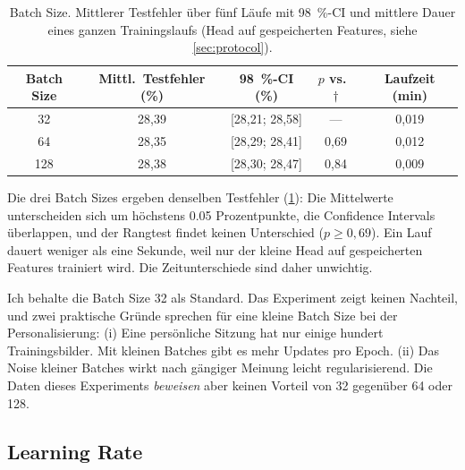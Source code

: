 \begin{table}[htbp]
  \centering
  \caption[Batch Size]{Batch Size. Mittlerer Testfehler über fünf Läufe mit
           \SI{98}{\percent}-CI und mittlere Dauer eines ganzen
           Trainingslaufs (Head auf gespeicherten Features, siehe
           \cref{sec:protocol}).}
  \label{tab:batch_size}
  \small
  \begin{tabular}{ccccc}
    \toprule
    Batch Size & Mittl.\ Testfehler (\%) & \SI{98}{\percent}-CI (\%) & $p$ vs.\ $\dagger$ & Laufzeit (min) \\
    \midrule
    32\sel{}     & 28,39 & [28,21; 28,58] & ---  & 0,019 \\
    64           & 28,35 & [28,29; 28,41] & 0,69 & 0,012 \\
    128          & 28,38 & [28,30; 28,47] & 0,84 & 0,009 \\
    \bottomrule
  \end{tabular}
\end{table}

Die drei Batch Sizes ergeben denselben Testfehler (\cref{tab:batch_size}): Die
Mittelwerte unterscheiden sich um höchstens \num{0,05} Prozentpunkte, die
Confidence Intervals überlappen, und der Rangtest findet keinen Unterschied
($p\ge0,69$). Ein Lauf dauert weniger als eine Sekunde, weil nur der kleine
Head auf gespeicherten Features trainiert wird. Die Zeitunterschiede sind
daher unwichtig.

Ich behalte die Batch Size 32 als Standard. Das Experiment zeigt keinen
Nachteil, und zwei praktische Gründe sprechen für eine kleine Batch Size bei
der Personalisierung: (i) Eine persönliche Sitzung hat nur einige hundert
Trainingsbilder. Mit kleinen Batches gibt es mehr Updates pro Epoch. (ii) Das
Noise kleiner Batches wirkt nach gängiger Meinung leicht regularisierend.
Die Daten dieses Experiments \emph{beweisen} aber keinen Vorteil von 32
gegenüber 64 oder 128.

\subsection{Learning Rate}
\label{sec:lr}

